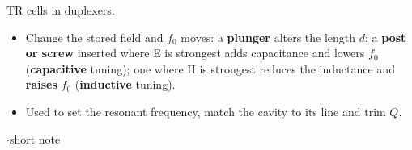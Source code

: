 {\begin{itemize}
    TR cells in duplexers.
\end{itemize}
\begin{itemize}
  \item Change the stored field and $f_0$ moves: a \textbf{plunger} alters the length $d$;
    a \textbf{post or screw} inserted where E is strongest adds capacitance and lowers
    $f_0$ (\textbf{capacitive} tuning); one where H is strongest reduces the
    inductance and \textbf{raises} $f_0$ (\textbf{inductive} tuning).
  \item Used to set the resonant frequency, match the cavity to its line and trim $Q$.
\end{itemize}}

\vspace{2pt}


{\color{sub}\footnotesize {}  \gap$\cdot$\gap short note}

